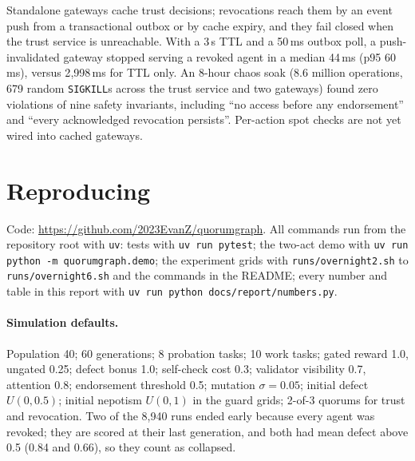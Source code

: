\documentclass[11pt]{article}
\newcommand{\code}[1]{\texttt{#1}}
\begin{document}
Standalone gateways cache trust decisions; revocations reach them by an event push from a
transactional outbox or by cache expiry, and they fail closed when the trust service is
unreachable. With a 3\,s TTL and a 50\,ms outbox poll, a push-invalidated gateway stopped
serving a revoked agent in a median 44\,ms (p95 60\,ms), versus 2{,}998\,ms for TTL only. An
8-hour chaos soak (8.6 million operations, 679 random \code{SIGKILL}s across the trust service
and two gateways) found zero violations of nine safety invariants, including ``no access before
any endorsement'' and ``every acknowledged revocation persists''. Per-action spot checks are not
yet wired into cached gateways.

\section{Reproducing}
\label{app:repro}

Code: \url{https://github.com/2023EvanZ/quorumgraph}. All commands run from the
repository root with \code{uv}: tests with \code{uv run pytest}; the two-act demo with
\code{uv run python -m quorumgraph.demo}; the experiment grids with \code{runs/overnight2.sh}
to \code{runs/overnight6.sh} and the commands in the README; every number and table in this
report with \code{uv run python docs/report/numbers.py}.

\paragraph{Simulation defaults.} Population 40; 60 generations; 8 probation tasks; 10 work
tasks; gated reward 1.0, ungated 0.25; defect bonus 1.0; self-check cost 0.3; validator
visibility 0.7, attention 0.8; endorsement threshold 0.5; mutation $\sigma = 0.05$; initial
defect $U(0, 0.5)$; initial nepotism $U(0, 1)$ in the guard grids; 2-of-3 quorums for trust and
revocation. Two of the 8{,}940 runs ended early because every agent was revoked; they are scored at
their last generation, and both had mean defect above 0.5 (0.84 and 0.66), so they count as
collapsed.
\end{document}
